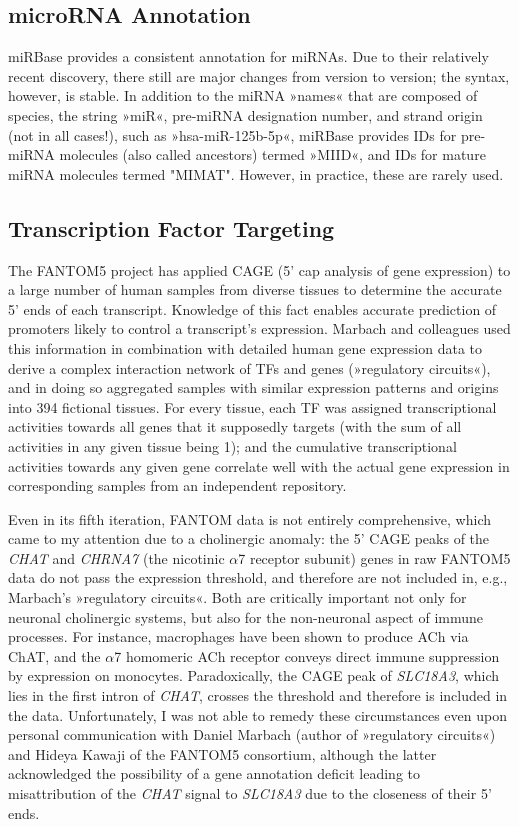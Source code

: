 \subsection{microRNA Annotation}
miRBase provides a consistent annotation for miRNAs. Due to their relatively recent discovery, there still are major changes from version to version; the syntax, however, is stable. In addition to the miRNA »names« that are composed of species, the string »miR«, pre-miRNA designation number, and strand origin (not in all cases!), such as »hsa-miR-125b-5p«, miRBase provides IDs for pre-miRNA molecules (also called ancestors) termed »MIID«, and IDs for mature miRNA molecules termed "MIMAT". However, in practice, these are rarely used.

\subsection{Transcription Factor Targeting} \label{database:TF}
The FANTOM5 project has applied CAGE (5' cap analysis of gene expression) to a large number of human samples from diverse tissues to determine the accurate 5' ends of each transcript\cite{Hon2017}. Knowledge of this fact enables accurate prediction of promoters likely to control a transcript's expression. Marbach and colleagues used this information in combination with detailed human gene expression data to derive a complex interaction network of TFs and genes (»regulatory circuits«), and in doing so aggregated samples with similar expression patterns and origins into 394 fictional tissues\cite{Marbach2016}. For every tissue, each TF was assigned transcriptional activities towards all genes that it supposedly targets (with the sum of all activities in any given tissue being 1); and the cumulative transcriptional activities towards any given gene correlate well with the actual gene expression in corresponding samples from an independent repository.

Even in its fifth iteration, FANTOM data is not entirely comprehensive, which came to my attention due to a cholinergic anomaly: the 5' CAGE peaks of the \textit{CHAT} and \textit{CHRNA7} (the nicotinic $\alpha$7 receptor subunit) genes in raw FANTOM5 data do not pass the expression threshold, and therefore are not included in, e.g., Marbach's »regulatory circuits«. Both are critically important not only for neuronal cholinergic systems, but also for the non-neuronal aspect of immune processes. For instance, macrophages have been shown to produce ACh via ChAT\cite{}, and the $\alpha$7 homomeric ACh receptor conveys direct immune suppression by expression on monocytes\cite{}. Paradoxically, the CAGE peak of \textit{SLC18A3}, which lies in the first intron of \textit{CHAT}, crosses the threshold and therefore is included in the data. Unfortunately, I was not able to remedy these circumstances even upon personal communication with Daniel Marbach (author of »regulatory circuits«) and Hideya Kawaji of the FANTOM5 consortium, although the latter acknowledged the possibility of a gene annotation deficit leading to misattribution of the \textit{CHAT} signal to \textit{SLC18A3} due to the closeness of their 5' ends.

